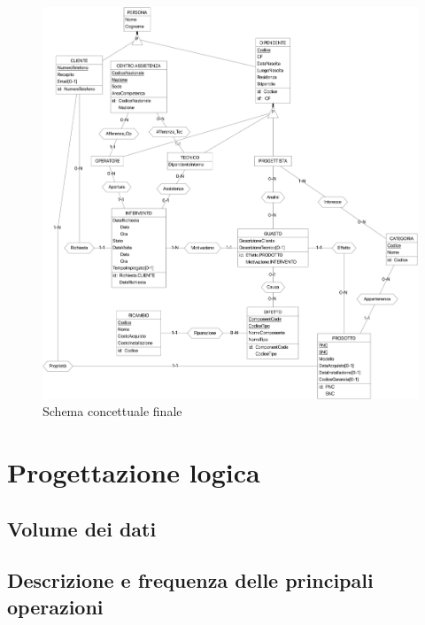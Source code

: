 \documentclass[a4paper, 12pt]{report}
\begin{document}
\begin{figure}[H]
	\centering
	\includegraphics[width=\linewidth]{images/conceptual.png}
	\caption{Schema concettuale finale}
\end{figure}

\chapter{Progettazione logica}

\section{Volume dei dati}

\section{Descrizione e frequenza delle principali operazioni}
\end{document}
